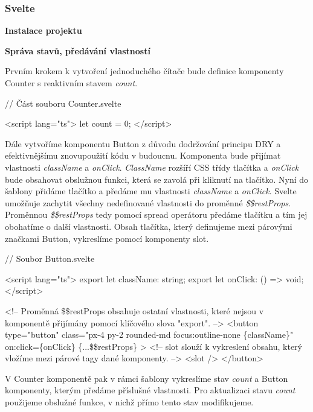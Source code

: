 \subsubsection{Svelte}

\begin{flushleft}
  \textbf{Instalace projektu}
\end{flushleft}

\begin{flushleft}
  \textbf{Správa stavů, předávání vlastností}
\end{flushleft}

Prvním krokem k vytvoření jednoduchého čítače bude definice komponenty Counter s reaktivním stavem \emph{count}.

\begin{prog}
// Část souboru Counter.svelte

<script lang="ts">
  let count = 0;
</script>
\end{prog}

Dále vytvoříme komponentu Button z důvodu dodržování principu DRY a efektivnějšímu znovupoužití kódu v budoucnu.
Komponenta bude přijímat vlastnosti \emph{className} a \emph{onClick}. \emph{ClassName} rozšíří CSS třídy tlačítka a \emph{onClick} bude obsahovat obslužnou funkci, která se zavolá při kliknutí na tlačítko.
Nyní do šablony přidáme tlačítko a předáme mu vlastnosti \emph{className} a \emph{onClick}.
Svelte umožňuje zachytit všechny nedefinované vlastnosti do proměnné \emph{\$\$restProps}. Proměnnou \emph{\$\$restProps} tedy pomocí spread operátoru předáme tlačítku a tím jej obohatíme o další vlastnosti. 
Obsah tlačítka, který definujeme mezi párovými značkami Button, vykreslíme pomocí komponenty slot.

\begin{prog}
// Soubor Button.svelte

<script lang="ts">
  export let className: string;
  export let onClick: () => void;
</script>

<!-- Proměnná \$\$restProps obsahuje ostatní vlastnosti, 
  které nejsou v komponentě přijímány pomocí klíčového slova "export". -->
<button
  type="button"
  class="px-4 py-2 rounded-md focus:outline-none \{className\}"
  on:click=\{onClick\}
  \{...\$\$restProps\}
>
  <!-- slot slouží k vykreslení obsahu, 
    který vložíme mezi párové tagy dané komponenty. -->
  <slot />
</button>
\end{prog}

V Counter komponentě pak v rámci šablony vykreslíme stav \emph{count} a Button komponenty, kterým předáme příslušné vlastnosti. 
Pro aktualizaci stavu \emph{count} použijeme obslužné funkce, v nichž přímo tento stav modifikujeme.

